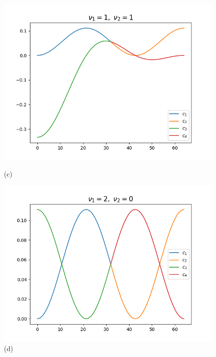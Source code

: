 \documentclass{homework}
\begin{document}
\begin{figure}[bhpt]
	\begin{minipage}[b]{0.5 \textwidth}
	\includegraphics[width=\textwidth]{Ex8_47_11.png}
	\caption{(c)}
	\end{minipage}
	\hspace{-0.2in}
	\begin{minipage}[b]{0.5 \textwidth}
	\includegraphics[width=\textwidth]{Ex8_47_20.png}
	\caption{(d)}
	\end{minipage}
	 
	\hspace{-40.0pt}
	\par \vspace{-10.pt}
	\hspace{-36.0pt}
	 

\end{figure}
\end{document}

